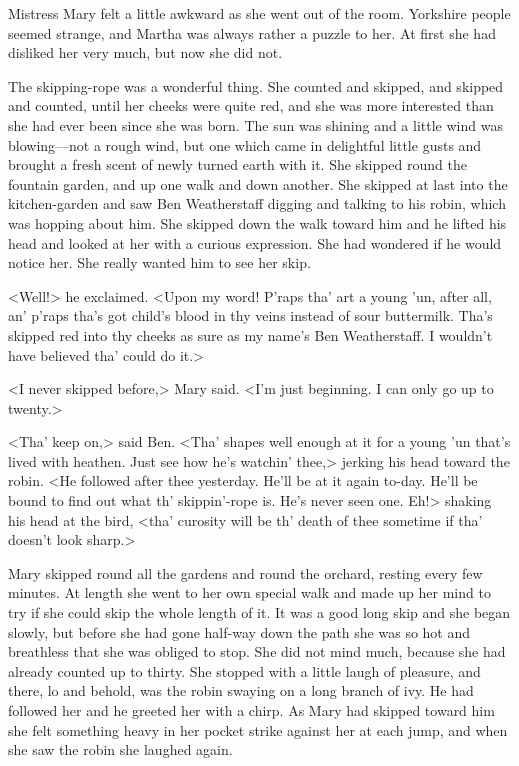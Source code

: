 Mistress Mary felt a little awkward as she went out of the room. Yorkshire people seemed strange, and Martha was always rather a puzzle to her. At first she had disliked her very much, but now she did not.

The skipping-rope was a wonderful thing. She counted and skipped, and skipped and counted, until her cheeks were quite red, and she was more interested than she had ever been since she was born. The sun was shining and a little wind was blowing—not a rough wind, but one which came in delightful little gusts and brought a fresh scent of newly turned earth with it. She skipped round the fountain garden, and up one walk and down another. She skipped at last into the kitchen-garden and saw Ben Weatherstaff digging and talking to his robin, which was hopping about him. She skipped down the walk toward him and he lifted his head and looked at her with a curious expression. She had wondered if he would notice her. She really wanted him to see her skip.

<Well!> he exclaimed. <Upon my word! P'raps tha' art a young 'un, after all, an' p'raps tha's got child's blood in thy veins instead of sour buttermilk. Tha's skipped red into thy cheeks as sure as my name's Ben Weatherstaff. I wouldn't have believed tha' could do it.>

<I never skipped before,> Mary said. <I'm just beginning. I can only go up to twenty.>

<Tha' keep on,> said Ben. <Tha' shapes well enough at it for a young 'un that's lived with heathen. Just see how he's watchin' thee,> jerking his head toward the robin. <He followed after thee yesterday. He'll be at it again to-day. He'll be bound to find out what th' skippin'-rope is. He's never seen one. Eh!> shaking his head at the bird, <tha' curosity will be th' death of thee sometime if tha' doesn't look sharp.>

Mary skipped round all the gardens and round the orchard, resting every few minutes. At length she went to her own special walk and made up her mind to try if she could skip the whole length of it. It was a good long skip and she began slowly, but before she had gone half-way down the path she was so hot and breathless that she was obliged to stop. She did not mind much, because she had already counted up to thirty. She stopped with a little laugh of pleasure, and there, lo and behold, was the robin swaying on a long branch of ivy. He had followed her and he greeted her with a chirp. As Mary had skipped toward him she felt something heavy in her pocket strike against her at each jump, and when she saw the robin she laughed again.

